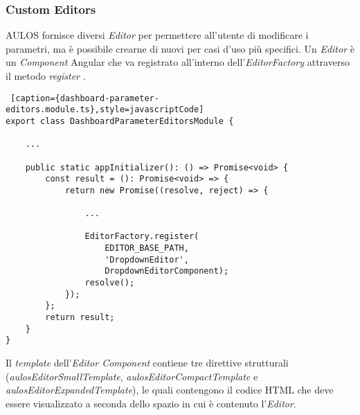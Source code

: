 \subsubsection{Custom Editors}
AULOS fornisce diversi \textit{Editor} per permettere all'utente di modificare i parametri, ma è possibile crearne di nuovi per casi d'uso più specifici. Un \textit{Editor} è un \textit{Component} Angular che va registrato all'interno dell'\textit{EditorFactory} attraverso il metodo \textit{register} .\\
\begin{lstlisting} [caption={dashboard-parameter-editors.module.ts},style=javascriptCode]
export class DashboardParameterEditorsModule {

    ...

    public static appInitializer(): () => Promise<void> {
        const result = (): Promise<void> => {
            return new Promise((resolve, reject) => {
            
                ...
                
                EditorFactory.register(
                    EDITOR_BASE_PATH,
                    'DropdownEditor',
                    DropdownEditorComponent);
                resolve();
            });
        };
        return result;
    }
}
\end{lstlisting}
Il \textit{template} dell'\textit{Editor Component} contiene tre direttive strutturali (\textit{aulosEditorSmallTemplate}, \textit{aulosEditorCompactTemplate} e \textit{aulosEditorExpandedTemplate}), le quali contengono il codice HTML che deve essere visualizzato a seconda dello spazio in cui è contenuto l'\textit{Editor}.
